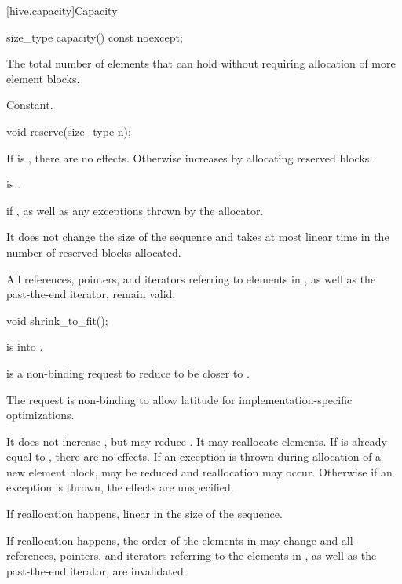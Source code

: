 [hive.capacity]{Capacity}

%
\begin{itemdecl}
size_type capacity() const noexcept;
\end{itemdecl}

\begin{itemdescr}
\pnum
\returns
The total number of elements that  can hold
without requiring allocation of more element blocks.

\pnum
\complexity
Constant.
\end{itemdescr}

%
\begin{itemdecl}
void reserve(size_type n);
\end{itemdecl}

\begin{itemdescr}
\pnum
\effects
If  is , there are no effects.
Otherwise increases  by allocating reserved blocks.

\pnum
\ensures
{} is .

\pnum
\throws
{} if ,
as well as any exceptions thrown by the allocator.

\pnum
\complexity
It does not change the size of the sequence and
takes at most linear time in the number of reserved blocks allocated.

\pnum
\remarks
All references, pointers, and iterators referring to elements in ,
as well as the past-the-end iterator, remain valid.
\end{itemdescr}

%
\begin{itemdecl}
void shrink_to_fit();
\end{itemdecl}

\begin{itemdescr}
\pnum
\expects
{} is  into .

\pnum
\effects
{} is a non-binding request
to reduce  to be closer to .
\begin{note}
The request is non-binding
to allow latitude for implementation-specific optimizations.
\end{note}
It does not increase , but may reduce .
It may reallocate elements.
If  is already equal to , there are no effects.
If an exception is thrown during allocation of a new element block,
 may be reduced and reallocation may occur.
Otherwise if an exception is thrown, the effects are unspecified.

\pnum
\complexity
If reallocation happens, linear in the size of the sequence.

\pnum
\remarks
If reallocation happens,
the order of the elements in  may change and
all references, pointers, and iterators
referring to the elements in ,
as well as the past-the-end iterator, are invalidated.
\end{itemdescr}

